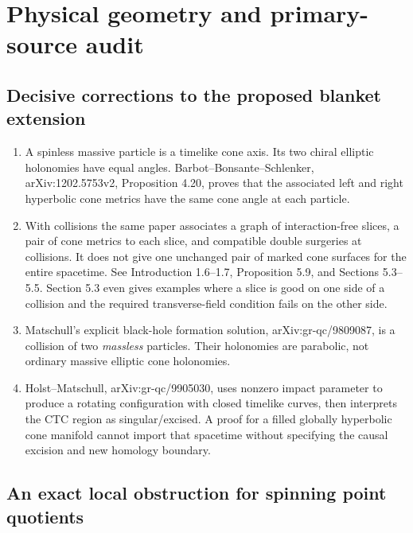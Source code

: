 \documentclass[11pt]{article}
\providecommand{\tightlist}{\setlength{\itemsep}{1pt}\setlength{\parskip}{0pt}}
\begin{document}
\clearpage

\section{Physical geometry and primary-source
audit}\label{physical-geometry-and-primary-source-audit}

\subsection{Decisive corrections to the proposed blanket
extension}\label{decisive-corrections-to-the-proposed-blanket-extension}

\begin{enumerate}
\def\labelenumi{\arabic{enumi}.}
\tightlist
\item
  A spinless massive particle is a timelike cone axis. Its two chiral
  elliptic holonomies have equal angles. Barbot--Bonsante--Schlenker,
  arXiv:1202.5753v2, Proposition 4.20, proves that the associated left
  and right hyperbolic cone metrics have the same cone angle at each
  particle.
\item
  With collisions the same paper associates a graph of interaction-free
  slices, a pair of cone metrics to each slice, and compatible double
  surgeries at collisions. It does not give one unchanged pair of marked
  cone surfaces for the entire spacetime. See Introduction 1.6--1.7,
  Proposition 5.9, and Sections 5.3--5.5. Section 5.3 even gives
  examples where a slice is good on one side of a collision and the
  required transverse-field condition fails on the other side.
\item
  Matschull's explicit black-hole formation solution,
  arXiv:gr-qc/9809087, is a collision of two \emph{massless} particles.
  Their holonomies are parabolic, not ordinary massive elliptic cone
  holonomies.
\item
  Holst--Matschull, arXiv:gr-qc/9905030, uses nonzero impact parameter
  to produce a rotating configuration with closed timelike curves, then
  interprets the CTC region as singular/excised. A proof for a filled
  globally hyperbolic cone manifold cannot import that spacetime without
  specifying the causal excision and new homology boundary.
\end{enumerate}

\subsection{An exact local obstruction for spinning point
quotients}\label{an-exact-local-obstruction-for-spinning-point-quotients}
\end{document}
